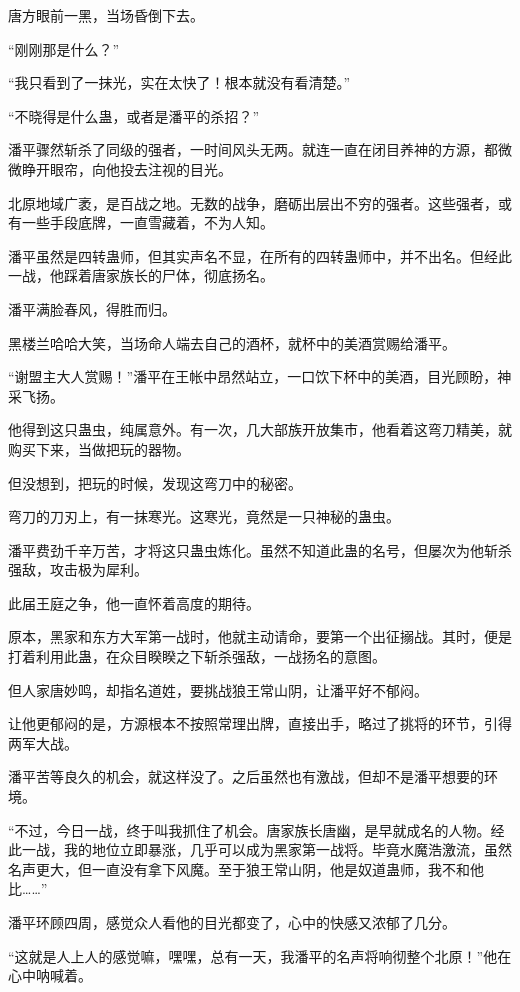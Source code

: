 \begin{this_body}
唐方眼前一黑，当场昏倒下去。

“刚刚那是什么？”

“我只看到了一抹光，实在太快了！根本就没有看清楚。”

“不晓得是什么蛊，或者是潘平的杀招？”

潘平骤然斩杀了同级的强者，一时间风头无两。就连一直在闭目养神的方源，都微微睁开眼帘，向他投去注视的目光。

北原地域广袤，是百战之地。无数的战争，磨砺出层出不穷的强者。这些强者，或有一些手段底牌，一直雪藏着，不为人知。

潘平虽然是四转蛊师，但其实声名不显，在所有的四转蛊师中，并不出名。但经此一战，他踩着唐家族长的尸体，彻底扬名。

潘平满脸春风，得胜而归。

黑楼兰哈哈大笑，当场命人端去自己的酒杯，就杯中的美酒赏赐给潘平。

“谢盟主大人赏赐！”潘平在王帐中昂然站立，一口饮下杯中的美酒，目光顾盼，神采飞扬。

他得到这只蛊虫，纯属意外。有一次，几大部族开放集市，他看着这弯刀精美，就购买下来，当做把玩的器物。

但没想到，把玩的时候，发现这弯刀中的秘密。

弯刀的刀刃上，有一抹寒光。这寒光，竟然是一只神秘的蛊虫。

潘平费劲千辛万苦，才将这只蛊虫炼化。虽然不知道此蛊的名号，但屡次为他斩杀强敌，攻击极为犀利。

此届王庭之争，他一直怀着高度的期待。

原本，黑家和东方大军第一战时，他就主动请命，要第一个出征搦战。其时，便是打着利用此蛊，在众目睽睽之下斩杀强敌，一战扬名的意图。

但人家唐妙鸣，却指名道姓，要挑战狼王常山阴，让潘平好不郁闷。

让他更郁闷的是，方源根本不按照常理出牌，直接出手，略过了挑将的环节，引得两军大战。

潘平苦等良久的机会，就这样没了。之后虽然也有激战，但却不是潘平想要的环境。

“不过，今日一战，终于叫我抓住了机会。唐家族长唐幽，是早就成名的人物。经此一战，我的地位立即暴涨，几乎可以成为黑家第一战将。毕竟水魔浩激流，虽然名声更大，但一直没有拿下风魔。至于狼王常山阴，他是奴道蛊师，我不和他比……”

潘平环顾四周，感觉众人看他的目光都变了，心中的快感又浓郁了几分。

“这就是人上人的感觉嘛，嘿嘿，总有一天，我潘平的名声将响彻整个北原！”他在心中呐喊着。

\end{this_body}

